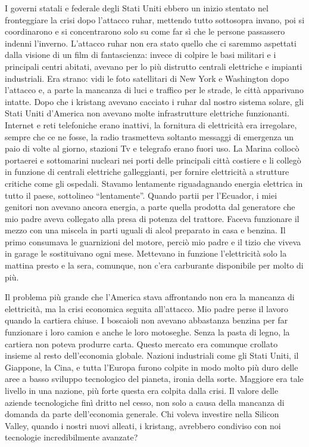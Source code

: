 I governi statali e federale degli Stati Uniti ebbero un inizio stentato
nel fronteggiare la crisi dopo l'attacco ruhar, mettendo tutto
sottosopra invano, poi si coordinarono e si concentrarono solo su come
far sì che le persone passassero indenni l'inverno. L'attacco ruhar non
era stato quello che ci saremmo aspettati dalla visione di un film di
fantascienza: invece di colpire le basi militari e i principali centri
abitati, avevano per lo più distrutto centrali elettriche e impianti
industriali. Era strano: vidi le foto satellitari di New York e
Washington dopo l'attacco e, a parte la mancanza di luci e traffico per
le strade, le città apparivano intatte. Dopo che i kristang avevano
cacciato i ruhar dal nostro sistema solare, gli Stati Uniti d'America
non avevano molte infrastrutture elettriche funzionanti. Internet e reti
telefoniche erano inattivi, la fornitura di elettricità era irregolare,
sempre che ce ne fosse, la radio trasmetteva soltanto messaggi di
emergenza un paio di volte al giorno, stazioni Tv e telegrafo erano
fuori uso. La Marina collocò portaerei e sottomarini nucleari nei porti
delle principali città costiere e li collegò in funzione di centrali
elettriche galleggianti, per fornire elettricità a strutture critiche
come gli ospedali. Stavamo lentamente riguadagnando energia elettrica in
tutto il paese, sottolineo ``lentamente''. Quando partii per l'Ecuador,
i miei genitori non avevano ancora energia, a parte quella prodotta dal
generatore che mio padre aveva collegato alla presa di potenza del
trattore. Faceva funzionare il mezzo con una miscela in parti uguali di
alcol preparato in casa e benzina. Il primo consumava le guarnizioni del
motore, perciò mio padre e il tizio che viveva in garage le sostituivano
ogni mese. Mettevano in funzione l'elettricità solo la mattina presto e
la sera, comunque, non c'era carburante disponibile per molto di più.

Il problema più grande che l'America stava affrontando non era la
mancanza di elettricità, ma la crisi economica seguita all'attacco. Mio
padre perse il lavoro quando la cartiera chiuse. I boscaioli non avevano
abbastanza benzina per far funzionare i loro camion e anche le loro
motoseghe. Senza la pasta di legno, la cartiera non poteva produrre
carta. Questo mercato era comunque crollato insieme al resto
dell'economia globale. Nazioni industriali come gli Stati Uniti, il
Giappone, la Cina, e tutta l'Europa furono colpite in modo molto più
duro delle aree a basso sviluppo tecnologico del pianeta, ironia della
sorte. Maggiore era tale livello in una nazione, più forte questa era
colpita dalla crisi. Il valore delle aziende tecnologiche finì dritto
nel cesso, non solo a causa della mancanza di domanda da parte
dell'economia generale. Chi voleva investire nella Silicon Valley,
quando i nostri nuovi alleati, i kristang, avrebbero condiviso con noi
tecnologie incredibilmente avanzate?

